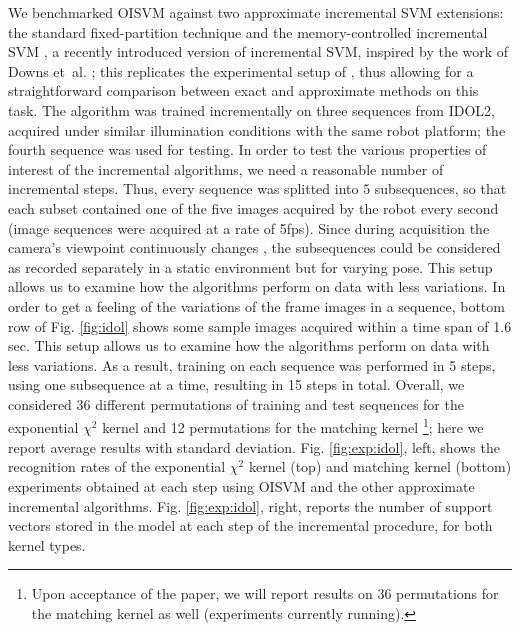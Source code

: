 We benchmarked OISVM against two approximate incremental SVM
extensions: the standard fixed-partition technique
\cite{syed99incremental} and the memory-controlled incremental SVM
\cite{luo:icra07}, a recently introduced version of incremental SVM,
inspired by the work of Downs et~al. \cite{DownsGM01}; this replicates
the experimental setup of \cite{luo:icra07}, thus allowing for a
straightforward comparison between exact and approximate methods on
this task.  The algorithm was trained incrementally on three sequences
from IDOL2, acquired under similar illumination conditions with the
same robot platform; the fourth sequence was used for testing. In
order to test the various properties of interest of the incremental
algorithms, we need a reasonable number of incremental steps.  Thus,
every sequence was splitted into $5$ subsequences, so that each subset
contained one of the five images acquired by the robot every second
(image sequences were acquired at a rate of 5fps). Since during
acquisition the camera's viewpoint continuously changes
\cite{luo:icra07}, the subsequences could be considered as recorded
separately in a static environment but for varying pose.  This setup
allows us to examine how the algorithms perform on data with less
variations. In order to get a feeling of the variations of the frame
images in a sequence, bottom row of Fig. \ref{fig:idol} shows some
sample images acquired within a time span of 1.6 sec. This setup
allows us to examine how the algorithms perform on data with less
variations. As a result, training on each sequence was performed in 5
steps, using one subsequence at a time, resulting in 15 steps in
total. Overall, we considered 36 different permutations of training
and test sequences for the exponential $\chi^2$ kernel and 12
permutations for the matching kernel \footnote{Upon acceptance of the
paper, we will report results on 36 permutations for the matching
kernel as well (experiments currently running).}; here we report
average results with standard deviation. Fig. \ref{fig:exp:idol},
left, shows the recognition rates of the exponential $\chi^2$ kernel
(top) and matching kernel (bottom) experiments obtained at each step
using OISVM and the other approximate incremental
algorithms. Fig. \ref{fig:exp:idol}, right, reports the number of
support vectors stored in the model at each step of the incremental
procedure, for both kernel types.

